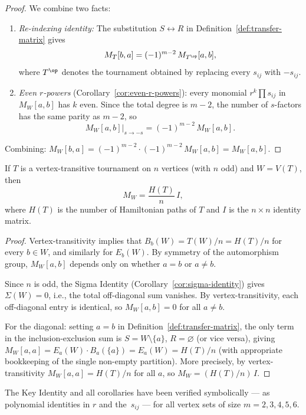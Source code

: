 
\begin{proof}
We combine two facts:
\begin{enumerate}[leftmargin=2em]
  \item \emph{Re-indexing identity:}
    The substitution $S \leftrightarrow R$ in
    Definition~\ref{def:transfer-matrix} gives
    \[
      M_T[b,a] = (-1)^{m-2}\, M_{T^{\op}}[a,b],
    \]
    where $T^{\op}$ denotes the tournament obtained by replacing every
    $s_{ij}$ with $-s_{ij}$.

  \item \emph{Even $r$-powers}
    (Corollary~\ref{cor:even-r-powers}):
    every monomial $r^k \prod s_{ij}$ in $M_W[a,b]$ has $k$ even.
    Since the total degree is $m - 2$, the number of $s$-factors has the
    same parity as $m - 2$, so
    \[
      M_W[a,b]\big|_{s \to -s} = (-1)^{m-2}\, M_W[a,b].
    \]
\end{enumerate}
Combining: $M_W[b,a] = (-1)^{m-2} \cdot (-1)^{m-2}\, M_W[a,b] = M_W[a,b]$.
\end{proof}

\begin{corollary}\label{cor:vertex-transitive}
If $T$ is a vertex-transitive tournament on $n$ vertices (with $n$ odd)
and $W = V(T)$, then
\[
  M_W = \frac{H(T)}{n}\, I,
\]
where $H(T)$ is the number of Hamiltonian paths of $T$ and $I$ is the
$n \times n$ identity matrix.
\end{corollary}

\begin{proof}
Vertex-transitivity implies that $B_b(W) = T(W)/n = H(T)/n$ for every
$b \in W$, and similarly for $E_b(W)$.
By symmetry of the automorphism group, $M_W[a,b]$ depends only on
whether $a = b$ or $a \neq b$.

Since $n$ is odd, the Sigma Identity
(Corollary~\ref{cor:sigma-identity}) gives $\Sigma(W) = 0$,
i.e., the total off-diagonal sum vanishes.
By vertex-transitivity, each off-diagonal entry is identical, so
$M_W[a,b] = 0$ for all $a \neq b$.

For the diagonal: setting $a = b$ in Definition~\ref{def:transfer-matrix},
the only term in the inclusion-exclusion sum is $S = W \setminus \{a\}$,
$R = \varnothing$ (or vice versa), giving
$M_W[a,a] = E_a(W) \cdot B_a(\{a\}) = E_a(W) = H(T)/n$
(with appropriate bookkeeping of the single non-empty partition).
More precisely, by vertex-transitivity $M_W[a,a] = H(T)/n$ for all $a$,
so $M_W = (H(T)/n)\, I$.
\end{proof}

\begin{remark}\label{rem:key-identity-verification}
The Key Identity and all corollaries have been verified symbolically ---
as polynomial identities in $r$ and the~$s_{ij}$ --- for all vertex sets
of size $m = 2, 3, 4, 5, 6$.
\end{remark}
